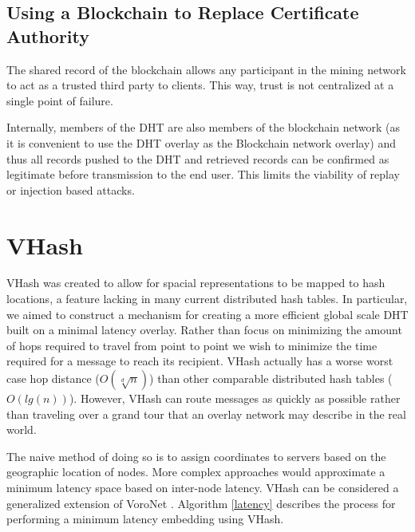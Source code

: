 \documentclass[11pt]{IEEEtran} %
\begin{document}
\subsection{Using a Blockchain to Replace Certificate Authority}
The shared record of the blockchain allows any participant in the mining network to act as a trusted third party to clients. This way, trust is not centralized at a single point of failure. 

Internally, members of the DHT are also members of the blockchain network (as it is convenient to use the DHT overlay as the Blockchain network overlay) and thus all records pushed to the DHT and retrieved records can be confirmed as legitimate before transmission to the end user. This limits the viability of replay or injection based attacks.




\section{VHash}
VHash was created to allow for spacial representations to be mapped to hash locations, a feature lacking in many current distributed hash tables.  In particular, we aimed to construct a mechanism for creating a more efficient global scale DHT built on a minimal latency overlay. Rather than focus on minimizing the amount of hops required to travel from point to point we wish to minimize the time required for a message to reach its recipient. VHash actually has a worse worst case hop distance ($O(\sqrt[d]{n})$) than other comparable distributed hash tables ($O(lg(n))$). However, VHash can route messages as quickly as possible rather than traveling over a grand tour that an overlay network may describe in the real world.

The naive method of doing so is to assign coordinates to servers based on the geographic location of nodes. More complex approaches would approximate a minimum latency space based on inter-node latency. VHash can be considered  a generalized extension of VoroNet \cite{voronet}.  %
Algorithm \ref{latency} describes the process for performing a minimum latency embedding using VHash.

\end{document}
